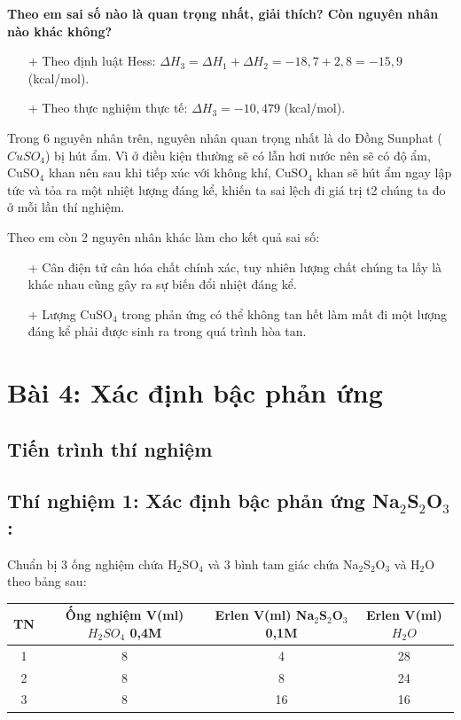\documentclass[12pt,a4paper]{report}
\begin{document}
\textbf{Theo em sai số nào là quan trọng nhất, giải thích? Còn nguyên nhân nào khác không?}
\begin{itemize}
    \item[+] Theo định luật Hess: $\Delta H_3 = \Delta H_1 + \Delta H_2 = -18,7 + 2,8 = -15,9$ (kcal/mol).
    \item[+] Theo thực nghiệm thực tế: $\Delta H_3 = -10,479$ (kcal/mol).
\end{itemize}
Trong 6 nguyên nhân trên, nguyên nhân quan trọng nhất là do Đồng Sunphat ($CuSO_4$) bị hút ẩm. Vì ở điều kiện thường sẽ có lẫn hơi nước nên sẽ có độ ẩm, CuSO$_4$ khan nên sau khi tiếp xúc với không khí, CuSO$_4$ khan sẽ hút ẩm ngay lập tức và tỏa ra một nhiệt lượng đáng kể, khiến ta sai lệch đi giá trị t2 chúng ta đo ở mỗi lần thí nghiệm. 

Theo em còn 2 nguyên nhân khác làm cho kết quả sai số: 
\begin{itemize}
    \item[+] Cân điện tử cân hóa chất chính xác, tuy nhiên lượng chất chúng ta lấy là khác nhau cũng gây ra sự biến đổi nhiệt đáng kể.
    \item[+] Lượng CuSO$_4$ trong phản ứng có thể không tan hết làm mất đi một lượng đáng kể phải được sinh ra trong quá trình hòa tan.
\end{itemize}
\newpage
\section{Bài 4: Xác định bậc phản ứng}
\subsection{Tiến trình thí nghiệm}
\subsection*{Thí nghiệm 1: Xác định bậc phản ứng Na$_2$S$_2$O$_3$:}
\noindent Chuẩn bị 3 ống nghiệm chứa H$_2$SO$_4$ và 3 bình tam giác chứa Na$_2$S$_2$O$_3$ và H$_2$O theo bảng sau:
\begin{center}
\begin{tabular}{|c|c|c|c|}
\hline
TN & Ống nghiệm V(ml) $H_2SO_4$ 0,4M & Erlen V(ml) Na$_2$S$_2$O$_3$ 0,1M & Erlen V(ml) $H_2O$ \\
\hline
1 & 8 & 4 & 28 \\
2 & 8 & 8 & 24 \\
3 & 8 & 16 & 16 \\
\hline
\end{tabular}
\end{center}
\end{document}
